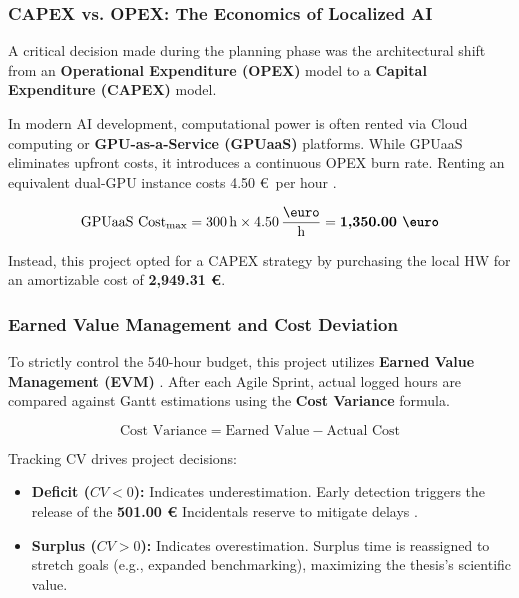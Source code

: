 \subsubsection*{CAPEX vs. OPEX: The Economics of Localized AI}

A critical decision made during the planning phase was the architectural shift from an \textbf{Operational Expenditure (OPEX)} model to a \textbf{Capital Expenditure (CAPEX)} model. 

In modern AI development, computational power is often rented via Cloud computing or \textbf{GPU-as-a-Service (GPUaaS)} platforms. While GPUaaS eliminates upfront costs, it introduces a continuous OPEX burn rate. Renting an equivalent dual-GPU instance costs  4.50 \euro\ per hour \cite{gpuaas_economics}. 

\begin{equation}
    \text{GPUaaS Cost}_{\text{max}} = 300 \, \text{h} \times 4.50 \, \frac{\text{\euro}}{\text{h}} = \textbf{1,350.00 \euro}
\end{equation}

Instead, this project opted for a CAPEX strategy by purchasing the local HW for an amortizable cost of \textbf{2,949.31 \euro}. 


\subsubsection*{Earned Value Management and Cost Deviation}

To strictly control the 540-hour budget, this project utilizes \textbf{Earned Value Management (EVM)} \cite{pmbok_guide}. After each Agile Sprint, actual logged hours are compared against Gantt estimations using the \textbf{Cost Variance} formula.

\begin{equation}
    \text{Cost Variance} = \text{Earned Value} - \text{Actual Cost}
\end{equation}

Tracking CV drives project decisions:

\begin{itemize}
    \item \textbf{Deficit ($CV < 0$):} Indicates underestimation. Early detection triggers the release of the \textbf{501.00 \euro} Incidentals reserve to mitigate delays \cite{pm_metrics_2023}.
    \item \textbf{Surplus ($CV > 0$):} Indicates overestimation. Surplus time is reassigned to stretch goals (e.g., expanded benchmarking), maximizing the thesis's scientific value.
\end{itemize}

